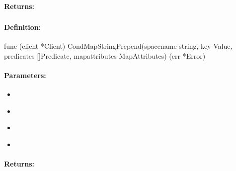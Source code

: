 \paragraph{Returns:}


\pagebreak
\subsubsection{}
\label{api:Go:CondMapStringPrepend}


\paragraph{Definition:}
\begin{gocode}
func (client *Client) CondMapStringPrepend(spacename string, key Value, predicates []Predicate, mapattributes MapAttributes) (err *Error)
\end{gocode}

\paragraph{Parameters:}
\begin{itemize}[noitemsep]
\item {}\\

\item {}\\

\item {}\\

\item {}\\

\end{itemize}

\paragraph{Returns:}


\pagebreak
\subsubsection{}
\label{api:Go:GroupMapStringPrepend}


